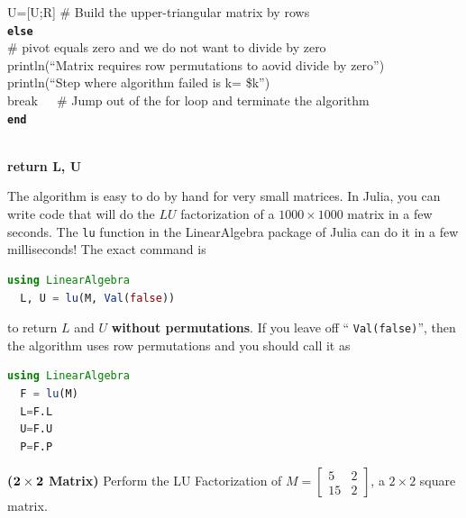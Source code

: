 \begin{tcolorbox}[sharp corners, colback=green!30, colframe=green!80!blue, title=\textbf{\Large LU Factorization (without permutations)}]
\hspace*{.6cm}    U=[U;R] \# Build the upper-triangular matrix by rows \\
\hspace*{.3cm} \texttt{\bf else} \\
\hspace*{.6cm} \# pivot equals zero and we do not want to divide by zero\\
\hspace*{.6cm}    println(``Matrix requires row permutations to aovid divide by zero'') \\
\hspace*{.6cm}   println(``Step where algorithm failed is k= \$k'')   \\
\hspace*{.6cm}    break~~~\# Jump out of the for loop and terminate the algorithm \\
 \hspace*{.3cm} \texttt{\bf end} 

\mbox{ } \\
  \textbf{return L, U}

\end{tcolorbox}

The algorithm is easy to do by hand for very small matrices. In Julia, you can write code that will do the $LU$ factorization of a $1000 \times 1000$ matrix in a few seconds. The \texttt{lu} function in the LinearAlgebra package of Julia can do it in a few milliseconds! The exact command is\\

\begin{lstlisting}[language=Julia]
  using LinearAlgebra
  L, U = lu(M, Val(false))
\end{lstlisting}
to return $L$ and $U$ \textbf{without permutations}. If you leave off `` \texttt{Val(false)}'', then the algorithm uses row permutations and you should call it as 
\begin{lstlisting}[language=Julia]
  using LinearAlgebra
  F = lu(M)
  L=F.L
  U=F.U
  P=F.P
\end{lstlisting} 
\vspace*{0.2cm}

\begin{example}
\label{ex:Lu01} 
\textbf{(${\bf 2 \times 2}$ Matrix)} Perform the LU Factorization of $M=\left[\begin{array}{rr} 5 & 2\\
15 & 2 \end{array}\right]$, a $2 \times 2$ square matrix.
\end{example}

